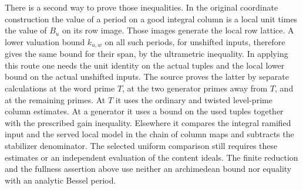 There is a second way to prove those inequalities. In the original
coordinate construction the value of a period on a good integral
column is a local unit times the value of $B_u$ on its row image.
Those images generate the local row lattice. A lower valuation bound
$k_{u,w}$ on all such periods, for unshifted inputs, therefore gives
the same bound for their span, by the ultrametric inequality.
In applying this route one needs the unit identity on the actual
tuples and the local lower bound on the actual unshifted inputs.
The source proves the latter by separate calculations at the word
prime $T$, at the two generator primes away from $T$, and at the
remaining primes. At $T$ it uses the ordinary and twisted
level-prime column estimates. At a generator it uses a bound on the
used tuples together with the prescribed gain inequality. Elsewhere it
compares the integral ramified input and the served local model in the
chain of column maps and subtracts the stabilizer denominator. The
selected uniform comparison still requires these estimates or an
independent evaluation of the content ideals. The finite reduction
and the fullness assertion above use neither an archimedean bound
nor equality with an analytic Bessel period.
